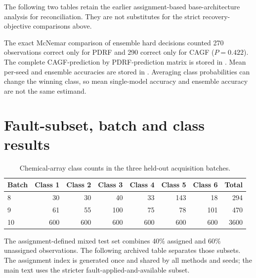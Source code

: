 \documentclass[10pt]{article}
\begin{document}
The following two tables retain the earlier assignment-based base-architecture analysis for reconciliation. They are not substitutes for the strict recovery-objective comparisons above.

\begin{table}[ht]
\centering
\caption{Archived assignment-based paired optimization-seed effects for the original base-architecture comparison. NLL is sign-aligned so that positive values favour PDRF.}
\resizebox{0.76\textwidth}{!}{}
\end{table}

\begin{table}[ht]
\centering
\caption{Archived assignment-based fixed-ensemble effects from 5,000 paired resamples. Positive aligned differences favour PDRF.}
\resizebox{0.82\textwidth}{!}{}
\end{table}

The exact McNemar comparison of ensemble hard decisions counted 270 observations correct only for PDRF and 290 correct only for CAGF ($P=0.422$). The complete CAGF-prediction by PDRF-prediction matrix is stored in . Mean per-seed and ensemble accuracies are stored in . Averaging class probabilities can change the winning class, so mean single-model accuracy and ensemble accuracy are not the same estimand.

\section{Fault-subset, batch and class results}

\begin{table}[ht]
\centering
\caption{Chemical-array class counts in the three held-out acquisition batches.}
\begin{tabular}{lrrrrrrr}
\toprule
Batch & Class 1 & Class 2 & Class 3 & Class 4 & Class 5 & Class 6 & Total\\
\midrule
8 & 30 & 30 & 40 & 33 & 143 & 18 & 294\\
9 & 61 & 55 & 100 & 75 & 78 & 101 & 470\\
10 & 600 & 600 & 600 & 600 & 600 & 600 & 3600\\
\bottomrule
\end{tabular}
\end{table}

The assignment-defined mixed test set combines 40\% assigned and 60\% unassigned observations. The following archived table separates those subsets. The assignment index is generated once and shared by all methods and seeds; the main text uses the stricter fault-applied-and-available subset.
\end{document}
